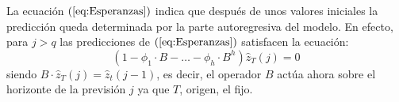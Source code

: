 La ecuaci\'on $(\ref{eq:Esperanzas})$ indica que despu\'es de unos valores
iniciales la predicci\'on queda determinada por la parte autoregresiva del
modelo. En efecto, para $j>q$ las predicciones de $(\ref{eq:Esperanzas})$
satisfacen la ecuaci\'on:
\begin{displaymath}
(1-\phi_1\cdot B-\dots-\phi_h\cdot B^h)\hat{z}_{T}(j) = 0
\end{displaymath}
siendo $B\cdot \hat{z}_T(j)=\hat{z}_t(j-1)$, es decir, el operador $B$ act\'ua
ahora sobre el horizonte de la previsi\'on $j$ ya que $T$, origen, el fijo.
